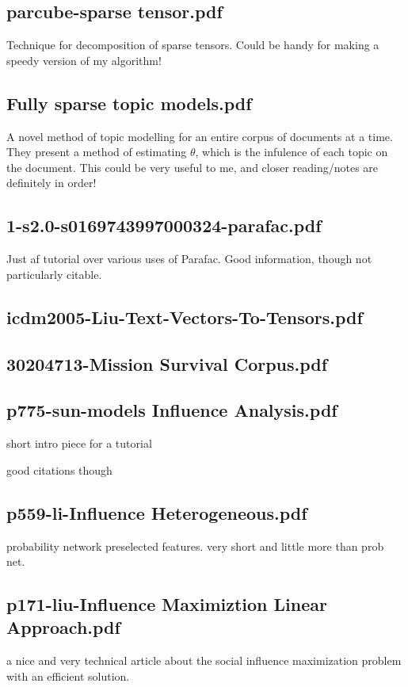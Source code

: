 \documentclass{article}
\begin{document}
\subsection{parcube-sparse tensor.pdf}
Technique for decomposition of sparse tensors.  Could be handy for
making a speedy version of my algorithm!

\subsection{Fully sparse topic models.pdf}
A novel method of topic modelling for an entire corpus of documents at a
time.  They present a method of estimating $\theta$, which is the 
infulence of each topic on the document.  This could be very 
useful to me, and closer reading/notes are definitely in order!

\subsection{1-s2.0-s0169743997000324-parafac.pdf}
Just af tutorial over various uses of Parafac.  Good information, though
not particularly citable.

\subsection{icdm2005-Liu-Text-Vectors-To-Tensors.pdf}

\subsection{30204713-Mission Survival Corpus.pdf}

\subsection{p775-sun-models Influence Analysis.pdf}
short intro piece for a tutorial

good citations though

\subsection{p559-li-Influence Heterogeneous.pdf}

probability network preselected features.
very short and little more than prob net.

\subsection{p171-liu-Influence Maximiztion Linear Approach.pdf}
a nice and very technical article about 
the social influence maximization problem
with an efficient solution.
\end{document}
